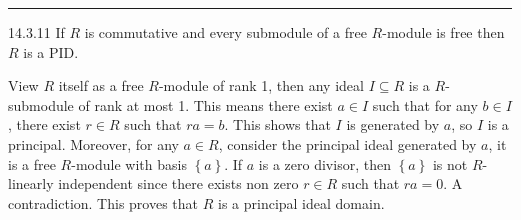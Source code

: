 \documentclass[a4paper, 12pt]{article}
\begin{document}
\noindent\rule{7in}{2.8pt}
\begin{problem}{14.3.11}
If \(R\) is commutative and every submodule of a free \(R\)-module is free then \(R\) is a PID.
\end{problem}
\begin{solution}
View \(R\) itself as a free \(R\)-module of rank 1, then any ideal \(I\subseteq R\) is a \(R\)-submodule of rank at most 1. This means there exist \(a\in I\) such that for any \(b\in I\), there exist \(r\in R\) such that 
\(ra=b\). This shows that \(I\) is generated by \(a\), so \(I\) is a principal. Moreover, for any \(a\in R\), consider the principal ideal generated by \(a\), it is a free \(R\)-module with basis \(\left\{a\right\}\). If \(a\) is a zero divisor, then \(\left\{a\right\}\) is not \(R\)-linearly independent since there exists non zero \(r\in R\) such that \(ra=0\). A contradiction. This proves that \(R\) is a principal ideal domain. 
\end{solution}
\end{document}
